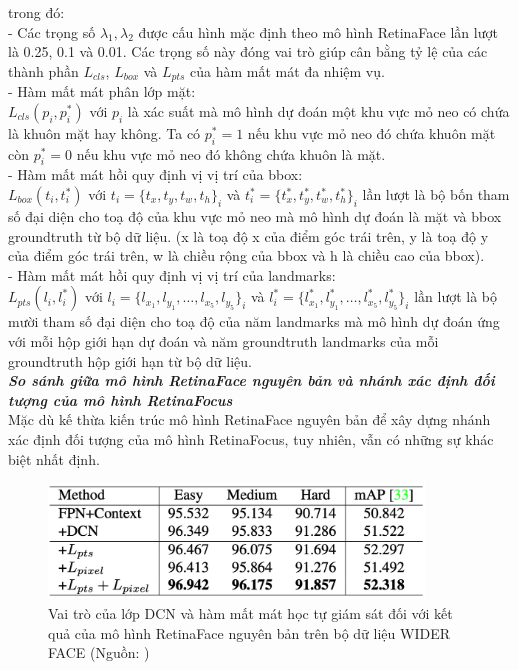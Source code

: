 {    \noindent
    trong đó: \\
    - Các trọng số $\lambda_1, \lambda_2$ được cấu hình mặc định theo mô hình RetinaFace \cite{deng2020retinaface} lần lượt là 0.25, 0.1 và 0.01. Các trọng số này đóng vai trò giúp cân bằng tỷ lệ của các thành phần $L_{cls}$, $L_{box}$ và $L_{pts}$ của hàm mất mát đa nhiệm vụ. \\
    - Hàm mất mát phân lớp mặt: \\
    $L_{cls}(p_i, p^{*}_i)$ với $p_i$ là xác suất mà mô hình dự đoán một khu vực mỏ neo có chứa là khuôn mặt hay không.
    Ta có $p^{*}_i = 1$ nếu khu vực mỏ neo đó chứa khuôn mặt còn $p^{*}_i = 0$ nếu khu vực mỏ neo đó không chứa khuôn là mặt. \\
    - Hàm mất mát hồi quy định vị vị trí của bbox: \\
    $L_{box}(t_i, t^{*}_i)$ với $t_i=\{t_x, t_y, t_w, t_h\}_i$ và $t^{*}_i=\{t^{*}_x, t^{*}_y, t^{*}_w, t^{*}_h\}_i$ lần lượt là bộ bốn tham số đại diện cho toạ độ của khu vực mỏ neo mà mô hình dự đoán là mặt và bbox groundtruth từ bộ dữ liệu.
    (x là toạ độ x của điểm góc trái trên, y là toạ độ y của điểm góc trái trên, w là chiều rộng của bbox và h là chiều cao của bbox). \\
    - Hàm mất mát hồi quy định vị vị trí của landmarks: \\
    $L_{pts} (l_i, l^{*}_i)$ với $l_i=\{l_{x_1}, l_{y_1}, \dots , l_{x_5}, l_{y_5}\}_i$ và $l^{*}_i=\{l^{*}_{x_1}, l^{*}_{y_1}, \dots , l^{*}_{x_5}, l^{*}_{y_5}\}_i$ lần lượt là bộ mười tham số đại diện cho toạ độ của năm landmarks mà mô hình dự đoán ứng với mỗi hộp giới hạn dự đoán và năm groundtruth landmarks của mỗi groundtruth hộp giới hạn từ bộ dữ liệu. \\

    \noindent
    \textbf{\textit{So sánh giữa mô hình RetinaFace nguyên bản và nhánh xác định đối tượng của mô hình RetinaFocus}} \\
    Mặc dù kế thừa kiến trúc mô hình RetinaFace nguyên bản để xây dựng nhánh xác định đối tượng của mô hình RetinaFocus, tuy nhiên, vẫn có những sự khác biệt nhất định.

    \begin{figure}[H]
        \centering
        \includegraphics[width=10cm] {images/retinaface_results_1}
        \caption{Vai trò của lớp DCN và hàm mất mát học tự giám sát đối với kết quả của mô hình RetinaFace nguyên bản trên bộ dữ liệu WIDER FACE (Nguồn: \cite{deng2020retinaface})}
        \label{fig:retinaface_results_1}
    \end{figure}

}

